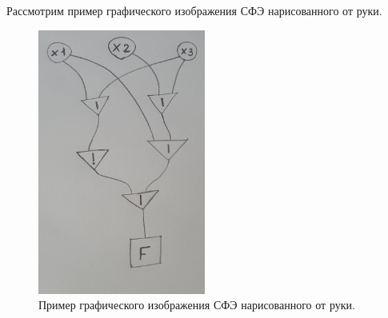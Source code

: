 \documentclass[makeidx, a4paper, 14pt]{extarticle}
\begin{document}
Рассмотрим пример графического изображения СФЭ нарисованного от руки.

\begin{figure}[H]
    \centering
    \includegraphics[width=55mm]{handwritten_1.png}
    \caption{Пример графического изображения СФЭ нарисованного от руки.}
    \label{fig:handwritten_1}
\end{figure}
\end{document}
